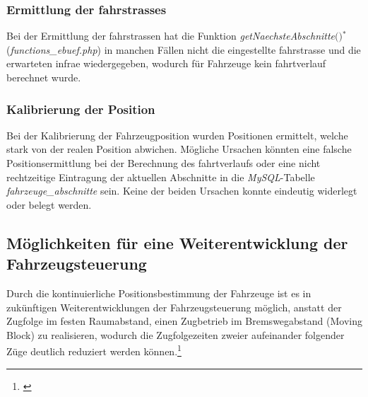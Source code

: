 \subsubsection{Ermittlung der \Glspl{fahrstrasse}}
Bei der Ermittlung der \Gls{fahrstrasse}n hat die Funktion \textit{getNaechsteAbschnitte$($$)$}$^\ast$ (\textit{functions\_ebuef.php}) in manchen Fällen nicht die eingestellte \Gls{fahrstrasse} und die erwarteten \ac{infra}e wiedergegeben, wodurch für Fahrzeuge kein \Gls{fahrtverlauf} berechnet wurde.
\subsubsection{Kalibrierung der Position}
Bei der Kalibrierung der Fahrzeugposition wurden Positionen ermittelt, welche stark von der realen Position abwichen. Mögliche Ursachen könnten eine falsche Positionsermittlung bei der Berechnung des \Gls{fahrtverlauf}s oder eine nicht rechtzeitige Eintragung der aktuellen Abschnitte in die \textit{MySQL}-Tabelle \textit{fahrzeuge\_abschnitte} sein. Keine der beiden Ursachen konnte eindeutig widerlegt oder belegt werden.
\subsection{Möglichkeiten für eine Weiterentwicklung der Fahrzeugsteuerung}
Durch die kontinuierliche Positionsbestimmung der Fahrzeuge ist es in zukünftigen Weiterentwicklungen der Fahrzeugsteuerung möglich, anstatt der Zugfolge im festen Raumabstand, einen Zugbetrieb im Bremswegabstand (Moving Block) zu realisieren, wodurch die Zugfolgezeiten zweier aufeinander folgender Züge deutlich reduziert werden können.\footnote{\citet[S. 37]{etr}}




















